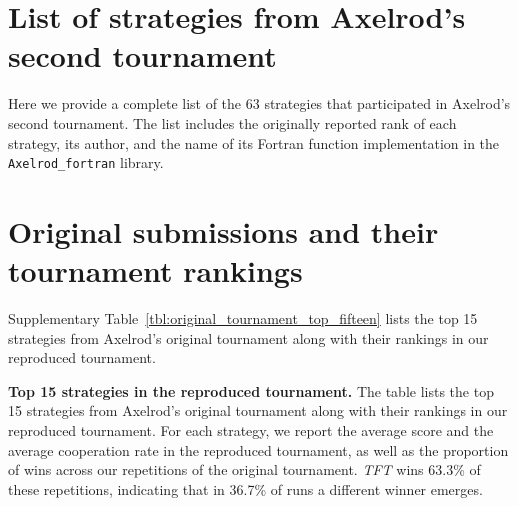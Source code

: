 \documentclass{article}
\newcommand{\TFT}{\emph{TFT}}
\newcommand{\AXLFortran}{\texttt{Axelrod\_fortran}}
\begin{document}
\section{List of strategies from Axelrod's second tournament}\label{app:list_of_original_players}

Here we provide a complete list of the 63 strategies that participated in
Axelrod's second tournament. The list includes the originally reported rank of each strategy, its
author, and the name of its Fortran function implementation in the
\AXLFortran{} library.

\begin{multicols}{2}
    \begin{enumerate}
        
    \end{enumerate}
\end{multicols}

\section{Original submissions and their tournament rankings}\label{app:tournament_rankings}

Supplementary Table~\ref{tbl:original_tournament_top_fifteen} lists the top 15
strategies from Axelrod's original tournament along with their rankings in our
reproduced tournament.

\begin{table}[!hbtp]
  \centering
  \resizebox{.9\textwidth}{!}{
    }
  \caption{\textbf{Top 15 strategies in the reproduced tournament.}
  The table lists the top 15 strategies from Axelrod's original tournament
  along with their rankings in our reproduced tournament. For each strategy, we
  report the average score and the average cooperation rate in the reproduced
  tournament, as well as the proportion of wins across our repetitions of the
  original tournament. \TFT{} wins 63.3\% of these repetitions, indicating that
  in 36.7\% of runs a different winner emerges.}
  \label{tbl:original_tournament_top_fifteen}
\end{table}
\end{document}
